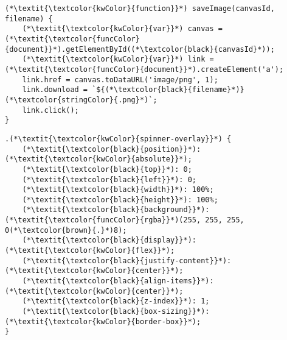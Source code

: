 \begin{lstlisting}[language=MyJavaScript, caption={[JavaScript \texttt{saveImage} function]\textbf{JavaScript \texttt{saveImage} function.} \texttt{saveImage} JavaScript function as implemented in LIGYSIS-web. This function takes an HTML canvas element identifier (\texttt{canvasId}) and a file name (\texttt{filename}) and saves a screenshot as a PNG file. It is used to save images from the Chart.js graphs as well as the 3Dmol.js viewer.}, label={saveimage_func}]
(*\textit{\textcolor{kwColor}{function}}*) saveImage(canvasId, filename) {
	(*\textit{\textcolor{kwColor}{var}}*) canvas = (*\textit{\textcolor{funcColor}{document}}*).getElementById((*\textcolor{black}{canvasId}*));
	(*\textit{\textcolor{kwColor}{var}}*) link = (*\textit{\textcolor{funcColor}{document}}*).createElement('a');
	link.href = canvas.toDataURL('image/png', 1);
	link.download = `${(*\textcolor{black}{filename}*)}(*\textcolor{stringColor}{.png}*)`;
	link.click();
}
\end{lstlisting}

\newpage

\begin{lstlisting}[language=MyCSS, caption={[CSS \texttt{spinner-overlay} class]\textbf{CSS \texttt{spinner-overlay} class.} Attributes of the \texttt{spinner-overlay} CSS class. This class is used to overlay a transparent white background to sit behind the spinner wheel that is shown while LIGYSIS-web is loading structures, reading files or performing calculations.}, label={CSS_class}]
.(*\textit{\textcolor{kwColor}{spinner-overlay}}*) {
    (*\textit{\textcolor{black}{position}}*): (*\textit{\textcolor{kwColor}{absolute}}*);
    (*\textit{\textcolor{black}{top}}*): 0;
    (*\textit{\textcolor{black}{left}}*): 0;
    (*\textit{\textcolor{black}{width}}*): 100%;
    (*\textit{\textcolor{black}{height}}*): 100%;
    (*\textit{\textcolor{black}{background}}*): (*\textit{\textcolor{funcColor}{rgba}}*)(255, 255, 255, 0(*\textcolor{brown}{.}*)8);
    (*\textit{\textcolor{black}{display}}*): (*\textit{\textcolor{kwColor}{flex}}*);
    (*\textit{\textcolor{black}{justify-content}}*): (*\textit{\textcolor{kwColor}{center}}*);
    (*\textit{\textcolor{black}{align-items}}*): (*\textit{\textcolor{kwColor}{center}}*);
    (*\textit{\textcolor{black}{z-index}}*): 1;
    (*\textit{\textcolor{black}{box-sizing}}*): (*\textit{\textcolor{kwColor}{border-box}}*);
}
\end{lstlisting}


